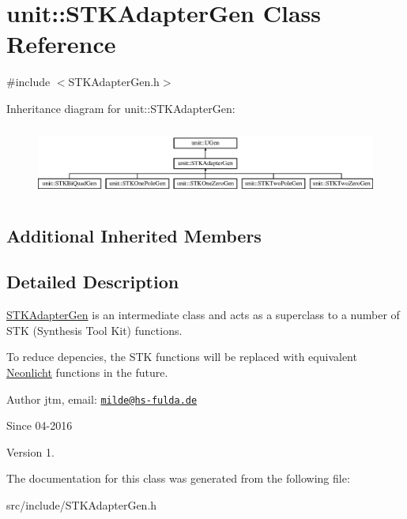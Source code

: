\hypertarget{classunit_1_1STKAdapterGen}{\section{unit\-:\-:S\-T\-K\-Adapter\-Gen Class Reference}
\label{classunit_1_1STKAdapterGen}
}


{\ttfamily \#include $<$S\-T\-K\-Adapter\-Gen.\-h$>$}

Inheritance diagram for unit\-:\-:S\-T\-K\-Adapter\-Gen\-:\begin{figure}[H]
\begin{center}
\leavevmode
\includegraphics[height=2.333333cm]{classunit_1_1STKAdapterGen}
\end{center}
\end{figure}
\subsection*{Additional Inherited Members}


\subsection{Detailed Description}
\hyperlink{classunit_1_1STKAdapterGen}{S\-T\-K\-Adapter\-Gen} is an intermediate class and acts as a superclass to a number of S\-T\-K (Synthesis Tool Kit) functions.

To reduce depencies, the S\-T\-K functions will be replaced with equivalent \hyperlink{classNeonlicht}{Neonlicht} functions in the future.

\begin{DoxyAuthor}{Author}
jtm, email\-:  \href{mailto:milde@hs-fulda.de}{\tt milde@hs-\/fulda.\-de} 
\end{DoxyAuthor}
\begin{DoxySince}{Since}
04-\/2016 
\end{DoxySince}
\begin{DoxyVersion}{Version}
1. 
\end{DoxyVersion}


The documentation for this class was generated from the following file\-:\begin{DoxyCompactItemize}
\item 
src/include/S\-T\-K\-Adapter\-Gen.\-h\end{DoxyCompactItemize}
